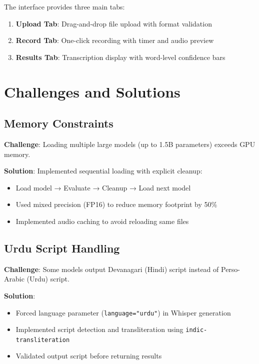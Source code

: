 The interface provides three main tabs:

\begin{enumerate}
    \item \textbf{Upload Tab}: Drag-and-drop file upload with format validation
    \item \textbf{Record Tab}: One-click recording with timer and audio preview
    \item \textbf{Results Tab}: Transcription display with word-level confidence bars
\end{enumerate}

\section{Challenges and Solutions}

\subsection{Memory Constraints}

\textbf{Challenge}: Loading multiple large models (up to 1.5B parameters) exceeds GPU memory.

\textbf{Solution}: Implemented sequential loading with explicit cleanup:
\begin{itemize}
    \item Load model → Evaluate → Cleanup → Load next model
    \item Used mixed precision (FP16) to reduce memory footprint by 50\%
    \item Implemented audio caching to avoid reloading same files
\end{itemize}

\subsection{Urdu Script Handling}

\textbf{Challenge}: Some models output Devanagari (Hindi) script instead of Perso-Arabic (Urdu) script.

\textbf{Solution}: 
\begin{itemize}
    \item Forced language parameter (\texttt{language="urdu"}) in Whisper generation
    \item Implemented script detection and transliteration using \texttt{indic-transliteration}
    \item Validated output script before returning results
\end{itemize}

